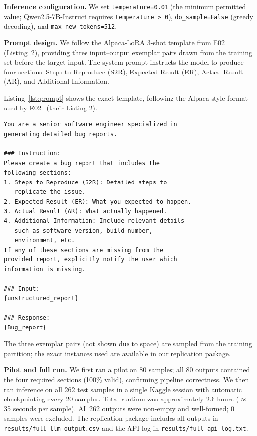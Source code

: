 \textbf{Inference configuration.}
We set \texttt{temperature=0.01} (the minimum permitted value;
Qwen2.5-7B-Instruct requires \texttt{temperature~>~0}),
\texttt{do\_sample=False} (greedy decoding), and
\texttt{max\_new\_tokens=512}.

\textbf{Prompt design.}
We follow the Alpaca-LoRA 3-shot template from
E02~\cite{acharya2025bugquality} (Listing~2), providing
three input--output exemplar pairs drawn from the training
set before the target input. The system prompt instructs
the model to produce four sections: Steps to Reproduce
(S2R), Expected Result (ER), Actual Result (AR), and
Additional Information.

Listing~\ref{lst:prompt} shows the exact template, following
the Alpaca-style format used by E02~\cite{acharya2025bugquality}
(their Listing 2).

\begin{lstlisting}[caption={Alpaca-style prompt template used for 3-shot inference, following E02~\protect\cite{acharya2025bugquality}.}, label={lst:prompt}, basicstyle=\ttfamily\scriptsize, breaklines=true]
You are a senior software engineer specialized in
generating detailed bug reports.

### Instruction:
Please create a bug report that includes the
following sections:
1. Steps to Reproduce (S2R): Detailed steps to
   replicate the issue.
2. Expected Result (ER): What you expected to happen.
3. Actual Result (AR): What actually happened.
4. Additional Information: Include relevant details
   such as software version, build number,
   environment, etc.
If any of these sections are missing from the
provided report, explicitly notify the user which
information is missing.

### Input:
{unstructured_report}

### Response:
{Bug_report}
\end{lstlisting}

The three exemplar pairs (not shown due to space) are
sampled from the training partition; the exact instances
used are available in our replication package.

\textbf{Pilot and full run.}
We first ran a pilot on 80 samples; all 80 outputs contained
the four required sections (100\% valid), confirming pipeline
correctness. We then ran inference on all 262 test samples in
a single Kaggle session with automatic checkpointing every
20 samples. Total runtime was approximately 2.6 hours
($\approx$35 seconds per sample). All 262 outputs were
non-empty and well-formed; 0 samples were excluded. The
replication package includes all outputs in
\texttt{results/full\_llm\_output.csv} and the API log in
\texttt{results/full\_api\_log.txt}.

